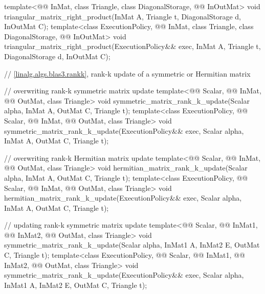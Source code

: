 \begin{codeblock}
{  template<@@ InMat, class Triangle, class DiagonalStorage, @@ InOutMat>
    void triangular_matrix_right_product(InMat A, Triangle t, DiagonalStorage d, InOutMat C);
  template<class ExecutionPolicy,
           @@ InMat, class Triangle, class DiagonalStorage, @@ InOutMat>
    void triangular_matrix_right_product(ExecutionPolicy&& exec,
                                         InMat A, Triangle t, DiagonalStorage d, InOutMat C);

  // \ref{linalg.algs.blas3.rankk}, rank-k update of a symmetric or Hermitian matrix

  // overwriting rank-k symmetric matrix update
  template<@@ Scalar, @@ InMat, @@ OutMat, class Triangle>
    void symmetric_matrix_rank_k_update(Scalar alpha, InMat A, OutMat C, Triangle t);
  template<class ExecutionPolicy, @@ Scalar,
           @@ InMat, @@ OutMat, class Triangle>
    void symmetric_matrix_rank_k_update(ExecutionPolicy&& exec,
                                        Scalar alpha, InMat A, OutMat C, Triangle t);

  // overwriting rank-k Hermitian matrix update
  template<@@ Scalar, @@ InMat, @@ OutMat, class Triangle>
    void hermitian_matrix_rank_k_update(Scalar alpha, InMat A, OutMat C, Triangle t);
  template<class ExecutionPolicy,
           @@ Scalar, @@ InMat, @@ OutMat, class Triangle>
    void hermitian_matrix_rank_k_update(ExecutionPolicy&& exec,
                                        Scalar alpha, InMat A, OutMat C, Triangle t);

  // updating rank-k symmetric matrix update
  template<@@ Scalar, @@ InMat1, @@ InMat2,
           @@ OutMat, class Triangle>
    void symmetric_matrix_rank_k_update(Scalar alpha, InMat1 A, InMat2 E, OutMat C, Triangle t);
  template<class ExecutionPolicy,
           @@ Scalar, @@ InMat1, @@ InMat2,
           @@ OutMat, class Triangle>
    void symmetric_matrix_rank_k_update(ExecutionPolicy&& exec, Scalar alpha,
                                        InMat1 A, InMat2 E, OutMat C, Triangle t);

}
\end{codeblock}

